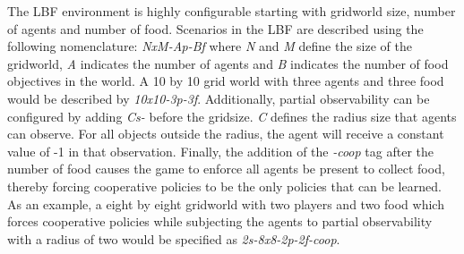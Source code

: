 \documentclass[systems,article,submit,pdftex,moreauthors]{Definitions/mdpi}
\begin{document}
The LBF environment is highly configurable starting with gridworld size, number of agents and number of food. Scenarios in the LBF are described using the following nomenclature: \textit{NxM-Ap-Bf} where \textit{N} and \textit{M} define the size of the gridworld, \textit{A} indicates the number of agents and \textit{B} indicates the number of food objectives in the world. A 10 by 10 grid world with three agents and three food would be described by \textit{10x10-3p-3f}. Additionally, partial observability can be configured by adding \textit{Cs-} before the gridsize. \textit{C} defines the radius size that agents can observe. For all objects outside the radius, the agent will receive a constant value of -1 in that observation. Finally, the addition of the \textit{-coop} tag after the number of food causes the game to enforce all agents be present to collect food, thereby forcing cooperative policies to be the only policies that can be learned. As an example, a eight by eight gridworld with two players and two food which forces cooperative policies while subjecting the agents to partial observability with a radius of two would be specified as \textit{2s-8x8-2p-2f-coop}. 


\end{document}
